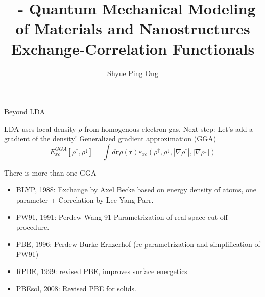 \documentclass[aspectratio=169]{beamer}
\title[\classname Exchange-Correlation Functionals]{\classname~- Quantum Mechanical Modeling of Materials and Nanostructures\\Exchange-Correlation Functionals}
\author{Shyue Ping Ong}
\institute[UCSD]{University of California, San Diego\\
\medskip
}
\date{\classyear} %
\let \vec \mathbf
\begin{document}
    \begin{frame}
        \titlepage %
    \end{frame}


    \begin{frame}{Beyond LDA}

        LDA uses local density $\rho$ from homogenous electron gas.\newline
        \newline
        Next step: Let’s add a gradient of the density!\newline
        \newline
        Generalized gradient approximation (GGA)
        \begin{equation*}
            E_{xc}^{GGA}[\rho^\uparrow, \rho^\downarrow] = \int d \vec{r} \rho(\vec{r})\varepsilon_{xc}(\rho^\uparrow, \rho^\downarrow, |\nabla\rho^\uparrow|, |\nabla\rho^\downarrow|)
        \end{equation*}

    \end{frame}

    \begin{frame}{There is more than one GGA}
        \begin{itemize}
            \item BLYP, 1988: Exchange by Axel Becke based on energy density of atoms, one parameter + Correlation by Lee-Yang-Parr.\cite{beckeDensityfunctionalExchangeenergyApproximation1988}
            \item PW91, 1991: Perdew-Wang 91 Parametrization of real-space cut-off procedure.\cite{burkeDerivationGeneralizedGradient1998}
            \item PBE, 1996: Perdew-Burke-Ernzerhof (re-parametrization and simplification of PW91)\cite{perdewGeneralizedGradientApproximation1996}
            \item RPBE, 1999: revised PBE, improves surface energetics
            \item PBEsol, 2008: Revised PBE for solids.\cite{perdewRestoringDensityGradientExpansion2008a}

        \end{itemize}


    \end{frame}
\end{document}
